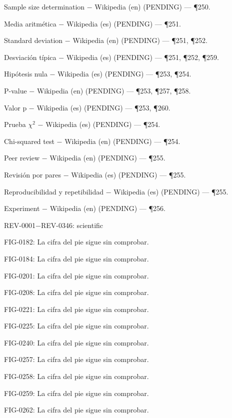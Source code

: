 \documentclass{book}
\begin{document}
\noindent Sample size determination \(-\) Wikipedia (en) (PENDING) --- \P250.

\noindent Media aritmética \(-\) Wikipedia (es) (PENDING) --- \P251.

\noindent Standard deviation \(-\) Wikipedia (en) (PENDING) --- \P251, \P252.

\noindent Desviación típica \(-\) Wikipedia (es) (PENDING) --- \P251, \P252, \P259.

\noindent Hipótesis nula \(-\) Wikipedia (es) (PENDING) --- \P253, \P254.

\noindent P-value \(-\) Wikipedia (en) (PENDING) --- \P253, \P257, \P258.

\noindent Valor p \(-\) Wikipedia (es) (PENDING) --- \P253, \P260.

\noindent Prueba \(\chi^{2}\) \(-\) Wikipedia (es) (PENDING) --- \P254.

\noindent Chi-squared test \(-\) Wikipedia (en) (PENDING) --- \P254.

\noindent Peer review \(-\) Wikipedia (en) (PENDING) --- \P255.

\noindent Revisión por pares \(-\) Wikipedia (es) (PENDING) --- \P255.

\noindent Reproducibilidad y repetibilidad \(-\) Wikipedia (es) (PENDING) --- \P255.

\noindent Experiment \(-\) Wikipedia (en) (PENDING) --- \P256.

\noindent REV-0001\(-\)REV-0346: scientific

\noindent FIG-0182: La cifra del pie sigue sin comprobar.

\noindent FIG-0184: La cifra del pie sigue sin comprobar.

\noindent FIG-0201: La cifra del pie sigue sin comprobar.

\noindent FIG-0208: La cifra del pie sigue sin comprobar.

\noindent FIG-0221: La cifra del pie sigue sin comprobar.

\noindent FIG-0225: La cifra del pie sigue sin comprobar.

\noindent FIG-0240: La cifra del pie sigue sin comprobar.

\noindent FIG-0257: La cifra del pie sigue sin comprobar.

\noindent FIG-0258: La cifra del pie sigue sin comprobar.

\noindent FIG-0259: La cifra del pie sigue sin comprobar.

\noindent FIG-0262: La cifra del pie sigue sin comprobar.
\end{document}
